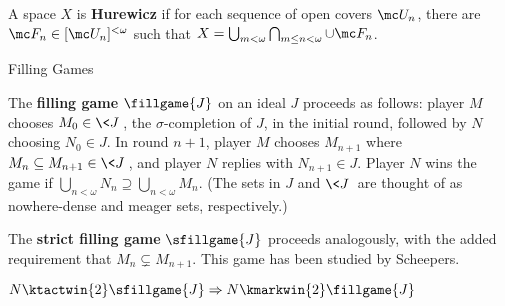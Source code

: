   \begin{defn}
    A space $X$ is \textbf{Hurewicz} if for each sequence of open covers $\mc U_n$, there are $\mc F_n \in [\mc U_n]^{<\omega}$ such that $X=\bigcup_{m<\omega}\bigcap_{m\leq n<\omega}\cup\mc F_n$.
  \end{defn}






















\newpage

  \centerline{Filling Games}

  \begin{defn}
    The \textbf{filling game} $\fillgame{J}$ on an ideal $J$ proceeds as follows: player $M$ chooses $M_0 \in \<J\>$, the $\sigma$-completion of $J$, in the initial round, followed by $N$ choosing $N_0\in J$. In round $n+1$, player $M$ chooses $M_{n+1}$ where $M_n\subseteq M_{n+1}\in\<J\>$, and player $N$ replies with $N_{n+1}\in J$. Player $N$ wins the game if $\bigcup_{n<\omega} N_n \supseteq \bigcup_{n<\omega} M_n$. (The sets in $J$ and $\<J\>$ are thought of as nowhere-dense and meager sets, respectively.)

    The \textbf{strict filling game} $\sfillgame{J}$ proceeds analogously, with the added requirement that $M_n\subsetneq M_{n+1}$. This game has been studied by Scheepers.
  \end{defn}

  \begin{thm}
    $N\ktactwin{2}\sfillgame{J} \Rightarrow N\kmarkwin{2}\fillgame{J}$
  \end{thm}

